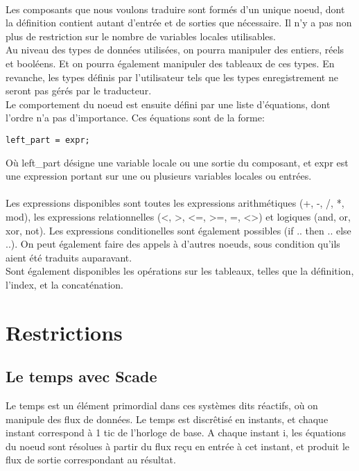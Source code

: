 \paragraph{}
Les composants que nous voulons traduire sont formés d'un unique
noeud, dont la définition contient autant d'entrée et de sorties que
nécessaire. Il n'y a pas non plus de restriction sur le nombre de
variables locales utilisables.\\
Au niveau des types de données utilisées, on pourra manipuler
des entiers, réels et booléens. Et on pourra également manipuler des
tableaux de ces types. En revanche, les types définis par
l'utilisateur tels que les types enregistrement ne seront pas gérés
par le traducteur.\\
Le comportement du noeud est ensuite défini par une liste d'équations,
dont l'ordre n'a pas d'importance. Ces équations sont de la forme:
\begin{verbatim}
left_part = expr;
\end{verbatim}
Où left\_part désigne une variable locale ou une sortie du composant, et expr
est une expression portant sur une ou plusieurs variables locales ou entrées.

\paragraph{}
Les expressions disponibles sont toutes les expressions arithmétiques
(+, -, /, *, mod), les expressions relationnelles (<, >, <=, >=, =, <>)
et logiques (and, or, xor, not). Les expressions conditionelles sont également
possibles (if .. then .. else ..). On peut également faire des appels à d'autres
noeuds, sous condition qu'ils aient été traduits auparavant. \\
Sont également disponibles les opérations sur les tableaux, telles que
la définition, l'index, et la concaténation.\\



\section{Restrictions}

\subsection{Le temps avec Scade}

Le temps est un élément primordial dans ces systèmes dits réactifs, où
on manipule des flux de données. Le temps est discrêtisé en instants,
et chaque instant correspond à 1 tic de l'horloge de base. A chaque
instant i, les équations du noeud sont résolues à partir du flux reçu
en entrée à cet instant, et produit le flux de sortie correspondant au
résultat.

